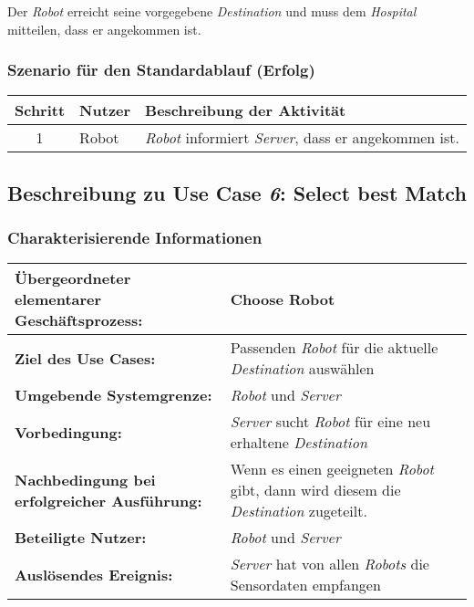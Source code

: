 			Der \emph{Robot} erreicht seine vorgegebene \emph{Destination} und muss dem \emph{Hospital} mitteilen, dass er angekommen ist. 

			\subsubsection*{Szenario für den Standardablauf (Erfolg)}

			\begin{table}[H]
				\centering
				\begin{tabularx}{\textwidth}{@{}cp{2cm}X@{}}
				\hline
				Schritt & Nutzer & Beschreibung der Aktivität \\ \hline
				1 & Robot & \emph{Robot} informiert \emph{Server}, dass er angekommen ist.
				\hline
				\end{tabularx}
			\end{table}

			
		\pagebreak

		\subsection{Beschreibung zu Use Case \emph{6}: Select best Match}

			\subsubsection*{Charakterisierende Informationen}

			\begin{table}[H]
				\centering
				\begin{tabularx}{\textwidth}{@{}p{5cm}X@{}}
				\hline
				\textbf{Übergeordneter elementarer Geschäftsprozess:} & Choose Robot \\ \hline
				\textbf{Ziel des Use Cases:} & Passenden \emph{Robot} für die aktuelle \emph{Destination} auswählen\\ \hline
				\textbf{Umgebende Systemgrenze:} & \emph{Robot} und \emph{Server} \\ \hline
				\textbf{Vorbedingung:} & \emph{Server} sucht \emph{Robot} für eine neu erhaltene \emph{Destination}\\ \hline
				\textbf{Nachbedingung bei erfolgreicher Ausführung:} & Wenn es einen geeigneten \emph{Robot} gibt, dann wird diesem die \emph{Destination} zugeteilt.\\ \hline
				\textbf{Beteiligte Nutzer:} & \emph{Robot} und \emph{Server}\\ \hline
				\textbf{Auslösendes Ereignis:} & \emph{Server} hat von allen \emph{Robots} die Sensordaten empfangen\\
				\hline
				\end{tabularx}
			\end{table}

